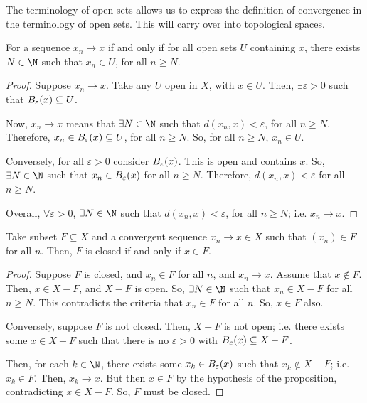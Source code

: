 The terminology of open sets allows us to express the definition of convergence in the terminology of open sets. This will carry over into topological spaces.
\begin{nlemma}
  For a sequence $x_n \to x$ if and only if for all open sets $U$ containing $x$, there exists $N \in \N$ such that $x_n \in U$, for all $n \geq N$.
\end{nlemma}
\begin{proof}
  Suppose $x_n \to x$. Take any $U$ open in $X$, with $x \in U$. Then, $\exists \varepsilon>0$ such that $B_{\varepsilon}(x) \subseteq U$.

  Now, $x_n \to x$ means that $\exists N \in \N$ such that $d(x_n, x) < \varepsilon$, for all $n \geq N$. Therefore, $x_n \in B_{\varepsilon}(x) \subseteq U$, for all $n \geq N$. So, for all $n \geq N$, $x_n \in U$.

  Conversely, for all $\varepsilon>0$ consider $B_{\varepsilon}(x)$. This is open and contains $x$. So, $\exists N \in \N$ such that $x_n \in B_{\varepsilon}(x)$ for all $n \geq N$. Therefore, $d(x_n, x) < \varepsilon$ for all $n \geq N$.

  Overall, $\forall \varepsilon>0$, $\exists N \in \N$ such that $d(x_n, x) < \varepsilon$, for all $n \geq N$; i.e. $x_n \to x$.
\end{proof}

\begin{nprop}
  Take subset $F \subseteq X$ and a convergent sequence $x_n \to x \in X$ such that $(x_n) \in F$ for all $n$. Then, $F$ is closed if and only if $x \in F$.
\end{nprop}
\begin{proof}
  Suppose $F$ is closed, and $x_n \in F$ for all $n$, and $x_n \to x$. Assume that $x \notin F$. Then, $x \in X-F$, and $X-F$ is open. So, $\exists N \in \N$ such that $x_n \in X-F$ for all $n \geq N$. This contradicts the criteria that $x_n \in F$ for all $n$. So, $x \in F$ also.

  Conversely, suppose $F$ is not closed. Then, $X-F$ is not open; i.e. there exists some $x \in X-F$ such that there is no $\varepsilon>0$ with $B_{\varepsilon}(x) \subseteq X - F$.

  Then, for each $k \in \N$, there exists some $x_k \in B_{\varepsilon}(x)$ such that $x_k \notin X-F$; i.e. $x_k \in F$. Then, $x_k \to x$. But then $x \in F$ by the hypothesis of the proposition, contradicting $x \in X-F$. So, $F$ must be closed.
\end{proof}

